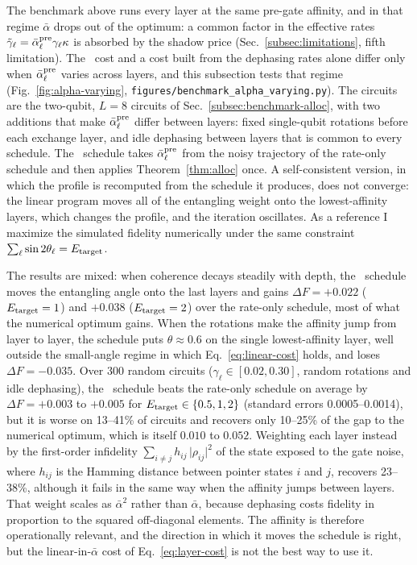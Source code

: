 The benchmark above runs every layer at the same pre-gate affinity, and
in that regime $\bar\alpha$ drops out of the optimum: a common factor in
the effective rates $\tilde\gamma_\ell =
\bar\alpha_\ell^{\rm pre}\gamma_\ell\kappa$ is absorbed by the shadow
price (Sec.~\ref{subsec:limitations}, fifth limitation).
The \RCF~cost and a cost built from the dephasing rates alone differ only
when $\bar\alpha_\ell^{\rm pre}$ varies across layers, and this
subsection tests that regime (Fig.~\ref{fig:alpha-varying},
\texttt{figures/\allowbreak benchmark\_\allowbreak alpha\_\allowbreak varying.py}).
The circuits are the two-qubit, $L = 8$ circuits of
Sec.~\ref{subsec:benchmark-alloc}, with two additions that make
$\bar\alpha_\ell^{\rm pre}$ differ between layers: fixed single-qubit
rotations before each exchange layer, and idle dephasing between
layers that is common to every schedule.
The \RCF\ schedule takes $\bar\alpha_\ell^{\rm pre}$ from the noisy
trajectory of the rate-only schedule and then applies
Theorem~\ref{thm:alloc} once.
A self-consistent version, in which the profile is recomputed from the
schedule it produces, does not converge: the linear program moves all
of the entangling weight onto the lowest-affinity layers, which changes
the profile, and the iteration oscillates.
As a reference I maximize the simulated fidelity numerically under the
same constraint $\sum_\ell \sin 2\theta_\ell = E_{\rm target}$.

The results are mixed: when coherence decays steadily with depth, the \RCF\ schedule moves
the entangling angle onto the last layers and gains
$\Delta F = +0.022$ ($E_{\rm target} = 1$) and $+0.038$
($E_{\rm target} = 2$) over the rate-only schedule, most of what the
numerical optimum gains.
When the rotations make the affinity jump from layer to layer, the
schedule puts $\theta \approx 0.6$ on the single lowest-affinity
layer, well outside the small-angle regime in which
Eq.~\eqref{eq:linear-cost} holds, and loses $\Delta F = -0.035$.
Over 300 random circuits
($\gamma_\ell \in [0.02, 0.30]$, random rotations and idle
dephasing), the \RCF\ schedule beats the rate-only schedule on average
by $\Delta F = +0.003$ to $+0.005$ for
$E_{\rm target} \in \{0.5, 1, 2\}$ (standard errors 0.0005--0.0014),
but it is worse on 13--41\% of circuits and recovers only 10--25\% of
the gap to the numerical optimum, which is itself
$0.010$ to $0.052$.
Weighting each layer instead by the first-order infidelity
$\sum_{i\neq j} h_{ij}\,\lvert\rho_{ij}\rvert^2$ of the state exposed
to the gate noise, where $h_{ij}$ is the Hamming distance between
pointer states $i$ and $j$, recovers 23--38\%, although it fails in
the same way when the affinity jumps between layers.
That weight scales as $\bar\alpha^2$ rather than $\bar\alpha$, because
dephasing costs fidelity in proportion to the squared off-diagonal
elements.
The affinity is therefore operationally relevant, and the direction in
which it moves the schedule is right, but the linear-in-$\bar\alpha$
cost of Eq.~\eqref{eq:layer-cost} is not the best way to use it.

